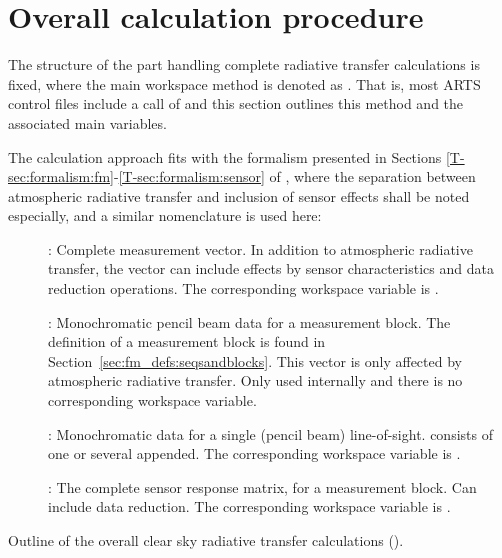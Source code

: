 \section{Overall calculation procedure}
\label{sec:fm_defs:calcproc}

The structure of the part handling complete radiative transfer calculations is
fixed, where the main workspace method is denoted as . That is,
most ARTS control files include a call of  and this section
outlines this method and the associated main variables.

The calculation approach fits with the formalism presented in Sections
\ref{T-sec:formalism:fm}-\ref{T-sec:formalism:sensor} of \theory, where the
separation between atmospheric radiative transfer and inclusion of sensor
effects shall be noted especially, and a similar nomenclature is used here:
\begin{description}
\item[\MsrVct]: Complete measurement vector. In addition to atmospheric
  radiative transfer, the vector can include effects by sensor characteristics
  and data reduction operations. The corresponding workspace variable is 
  .
\item[]: Monochromatic pencil beam data for a measurement block. The
  definition of a measurement block is found in
  Section~\ref{sec:fm_defs:seqsandblocks}. This vector is only affected by
  atmospheric radiative transfer. Only used internally and there is no
  corresponding workspace variable.
\item[]: Monochromatic data for a single (pencil beam)
  line-of-sight.  consists of one or several  appended.
  The corresponding workspace variable is .
\item[]: The complete sensor response matrix, for a measurement
  block. Can include data reduction. The corresponding workspace variable is
  .
\end{description}
\begin{algorithm}[t]
 \begin{algorithmic}
   \ENDFOR
  \ENDFOR
 \end{algorithmic}
 \caption{Outline of the overall clear sky radiative transfer calculations
   ().}
 \label{alg:fm_defs:yCalc}
\end{algorithm}
